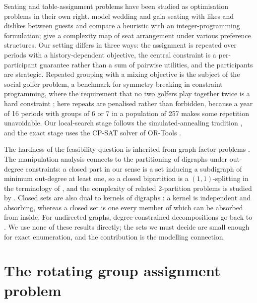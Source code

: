 \documentclass[11pt,a4paper]{article}
\theoremstyle{plain}
\theoremstyle{definition}
\theoremstyle{remark}
\begin{document}
Seating and table-assignment problems have been studied as optimisation problems in their own right. \citet{lewis2016seating} model wedding and gala seating with likes and dislikes between guests and compare a heuristic with an integer-programming formulation; \citet{ceylan2023seat} give a complexity map of seat arrangement under various preference structures. Our setting differs in three ways: the assignment is repeated over periods with a history-dependent objective, the central constraint is a per-participant guarantee rather than a sum of pairwise utilities, and the participants are strategic. Repeated grouping with a mixing objective is the subject of the social golfer problem, a benchmark for symmetry breaking in constraint programming, where the requirement that no two golfers play together twice is a hard constraint \citep{dotu2005golfers}; here repeats are penalised rather than forbidden, because a year of 16 periods with groups of 6 or 7 in a population of 257 makes some repetition unavoidable. Our local-search stage follows the simulated-annealing tradition \citep{metropolis1953,kirkpatrick1983annealing}, and the exact stage uses the CP-SAT solver of OR-Tools \citep{ortools}.

The hardness of the feasibility question is inherited from graph factor problems \citep{kirkpatrick1983factor,garey1979}. The manipulation analysis connects to the partitioning of digraphs under out-degree constraints: a closed part in our sense is a set inducing a subdigraph of minimum out-degree at least one, so a closed bipartition is a $(1,1)$-splitting in the terminology of \citet{alon2006splitting}, and the complexity of related 2-partition problems is studied by \citet{bangjensen2016partitions1,bangjensen2016partitions2}. Closed sets are also dual to kernels of digraphs \citep{richardson1953}: a kernel is independent and absorbing, whereas a closed set is one every member of which can be absorbed from inside. For undirected graphs, degree-constrained decompositions go back to \citet{stiebitz1996}. We use none of these results directly; the sets we must decide are small enough for exact enumeration, and the contribution is the modelling connection.

\section{The rotating group assignment problem}
\label{sec:problem}
\end{document}
